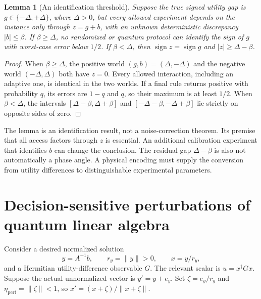\documentclass[11pt,a4paper]{article}
\newtheorem{lemma}[theorem]{Lemma}
\theoremstyle{definition}
\theoremstyle{remark}
\numberwithin{equation}{section}
\begin{document}
\begin{lemma}[An identification threshold]\label{thm:bias}
Suppose the true signed utility gap is $g\in\{-\Delta,+\Delta\}$,
where $\Delta>0$, but every allowed experiment depends on the instance
only through $z=g+b$, with an unknown deterministic discrepancy
$|b|\leq\beta$.
If $\beta\geq\Delta$, no randomized or quantum protocol can identify the
sign of $g$ with worst-case error below $1/2$.
If $\beta<\Delta$, then $\operatorname{sign}z=\operatorname{sign}g$ and
$|z|\geq\Delta-\beta$.
\end{lemma}
\begin{proof}
When $\beta\geq\Delta$, the positive world $(g,b)=(\Delta,-\Delta)$
and the negative world $(-\Delta,\Delta)$ both have $z=0$.
Every allowed interaction, including an adaptive one, is identical in the
two worlds. If a final rule returns positive with probability $q$, its
errors are $1-q$ and $q$, so their maximum is at least $1/2$.
When $\beta<\Delta$, the intervals
$[\Delta-\beta,\Delta+\beta]$ and
$[-\Delta-\beta,-\Delta+\beta]$ lie strictly on opposite sides of zero.
\end{proof}

The lemma is an identification result, not a noise-correction theorem.
Its premise that all access factors through $z$ is essential. An additional
calibration experiment that identifies $b$ can change the conclusion.
The residual gap $\Delta-\beta$ is also not automatically a phase angle.
A physical encoding must supply the conversion from utility differences
to distinguishable experimental parameters.

\section{Decision-sensitive perturbations of quantum linear algebra}\label{sec:decisionperturb}
Consider a desired normalized solution
\begin{equation}
 y=A^{-1}b,\qquad r_y=\|y\|>0,\qquad x=y/r_y,
\end{equation}
and a Hermitian utility-difference observable $G$.
The relevant scalar is $u=x^\dagger Gx$.
Suppose the actual unnormalized vector is $y'=y+e_y$.
Set $\zeta=e_y/r_y$ and $\eta_{\mathrm{pert}}=\|\zeta\|<1$, so
$x'=(x+\zeta)/\|x+\zeta\|$.
\end{document}
